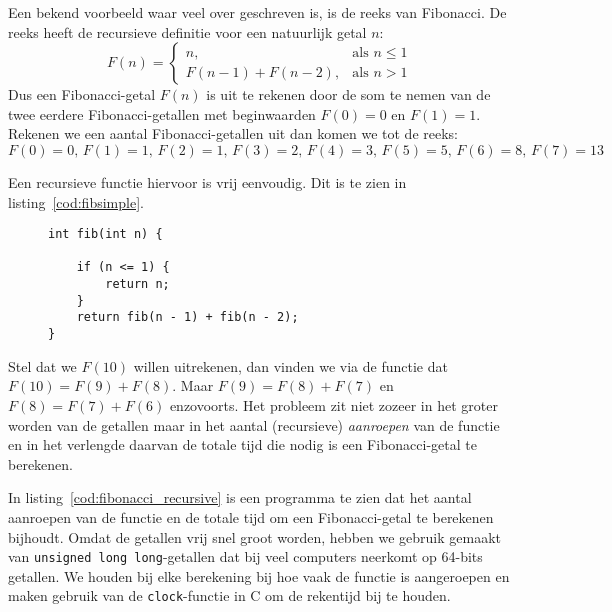 Een bekend voorbeeld waar veel over geschreven is, is de reeks van Fibonacci. De reeks heeft de recursieve definitie voor een natuurlijk getal $n$:
%
\begin{equation}
\label{eq:fib_rec}
	F(n) =
	\begin{cases}
		n, & \text{als $n \leq 1$}\\
		F(n-1)+F(n-2), & \text{als $n > 1$}
	\end{cases}
\end{equation}
%
Dus een Fibonacci-getal $F(n)$ is uit te rekenen door de som te nemen van de twee eerdere Fibonacci-getallen met beginwaarden $F(0) = 0$ en $F(1) = 1$. Rekenen we een aantal Fibonacci-getallen uit dan komen we tot de reeks:
%
\begin{equation}
F(0)=0,\, F(1) = 1,\, F(2)=1,\, F(3)=2,\, F(4) =3,\, F(5)=5,\, F(6)=8,\, F(7)=13
\end{equation}

Een recursieve functie hiervoor is vrij eenvoudig. Dit is te zien in listing~\ref{cod:fibsimple}.

\begin{figure}[!ht]
\begin{lstlisting}[caption=Recursieve functie voor berekenen van Fibonacci-getallen.,label=cod:fibsimple]
int fib(int n) {

    if (n <= 1) {
        return n;
    }
    return fib(n - 1) + fib(n - 2);
}
\end{lstlisting}
\end{figure}

Stel dat we $F(10)$ willen uitrekenen, dan vinden we via de functie dat $F(10)= F(9)+F(8)$. Maar $F(9) =F(8)+F(7)$ en $F(8)=F(7)+F(6)$ enzovoorts. Het probleem zit niet zozeer in het groter worden van de getallen maar in het aantal (recursieve) \textsl{aanroepen} van de functie en in het verlengde daarvan de totale tijd die nodig is een Fibonacci-getal te berekenen.

In listing~\ref{cod:fibonacci_recursive} is een programma te zien dat het aantal aanroepen van de functie en de totale tijd om een Fibonacci-getal te berekenen bijhoudt. Omdat de getallen vrij snel groot worden, hebben we gebruik gemaakt van \texttt{unsigned long long}-getallen dat bij veel computers neerkomt op 64-bits getallen.
We houden bij elke berekening bij hoe vaak de functie is aangeroepen en maken gebruik van de \texttt{clock}-functie in C om de rekentijd bij te houden.

